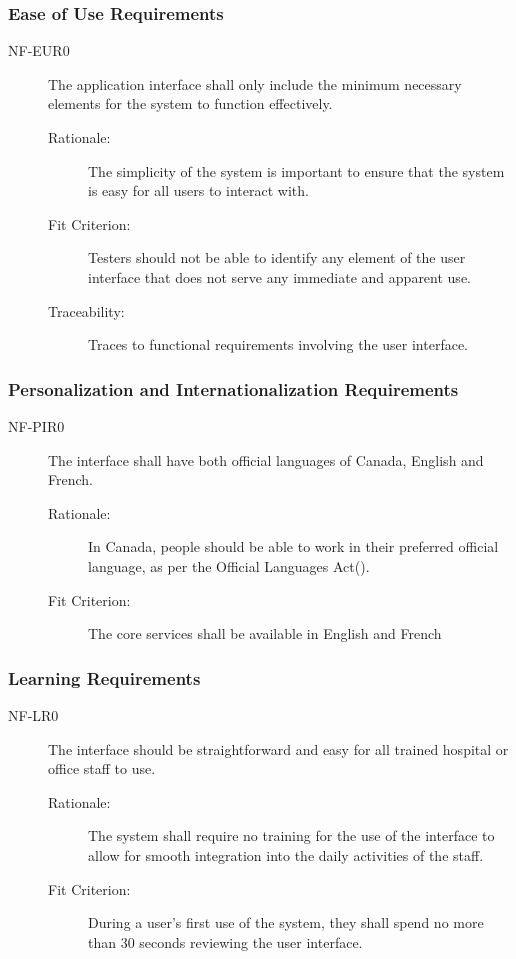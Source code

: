 \documentclass[12pt]{article}
\begin{document}
\subsubsection{Ease of Use Requirements}
\begin{description}
    \item[NF-EUR0] The application interface shall only include the minimum necessary elements for the system to function effectively.
    \begin{description}
        \item[Rationale:] The simplicity of the system is important to ensure that the system is easy for all users to interact with.
        \item[Fit Criterion:] Testers should not be able to identify any element of the user interface that does not serve any immediate and apparent use.
        \item[Traceability:] Traces to functional requirements involving the user interface.
    \end{description}
\end{description}

\subsubsection{Personalization and Internationalization Requirements}
\begin{description}
    \item[NF-PIR0] The interface shall have both official languages of Canada, English and French.
    \begin{description}
        \item[Rationale:] In Canada, people should be able to work in their preferred official language, as per the Official Languages Act(\cite{OLA}).
        \item[Fit Criterion:] The core services shall be available in English and French
    \end{description}
\end{description}

\subsubsection{Learning Requirements}
\begin{description}
    \item[NF-LR0] The interface should be straightforward and easy for all trained hospital or office staff to use.  
    \begin{description}
        \item[Rationale:] The system shall require no training for the use of the interface to allow for smooth integration into the daily activities of the staff.
        \item[Fit Criterion:] During a user's first use of the system, they shall spend no more than 30 seconds reviewing the user interface.
    \end{description}
\end{description}
\end{document}
